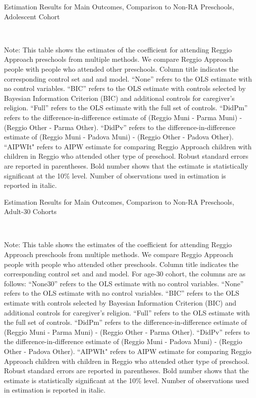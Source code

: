 \begin{table}[H] \caption{Estimation Results for Main Outcomes, Comparison to Non-RA Preschools, Adolescent Cohort} \label{ols-M-adol-reg-pres}
\scalebox{0.7}{}
\vspace{1ex} \\
\footnotesize\raggedright{Note: This table shows the estimates of the coefficient for attending Reggio Approach preschools from multiple methods. We compare Reggio Approach people with people who attended other preschools. Column title indicates the corresponding control set and and model. ``None'' refers to the OLS estimate with no control variables. ``BIC'' refers to the OLS estimate with controls selected by Bayesian Information Criterion (BIC) and additional controls for caregiver's religion. ``Full'' refers to the OLS estimate with the full set of controls. ``DidPm'' refers to the difference-in-difference estimate of (Reggio Muni - Parma Muni) - (Reggio Other - Parma Other). ``DidPv'' refers to the difference-in-difference estimate of (Reggio Muni - Padova Muni) - (Reggio Other - Padova Other). ``AIPWIt" refers to AIPW estimate for comparing Reggio Approach children with children in Reggio who attended other type of preschool. Robust standard errors are reported in parentheses. Bold number shows that the estimate is statistically significant at the 10\% level. Number of observations used in estimation is reported in italic.}
\end{table}




\begin{table}[H] \caption{Estimation Results for Main Outcomes, Comparison to Non-RA Preschools, Adult-30 Cohorts} \label{ols-M-adult30-reg-pres}
\scalebox{0.65}{}
\vspace{1ex} \\
\footnotesize\raggedright{Note: This table shows the estimates of the coefficient for attending Reggio Approach preschools from multiple methods. We compare Reggio Approach people with people who attended other preschools.  Column title indicates the corresponding control set and and model. For age-30 cohort, the columns are as follows: ``None30'' refers to the OLS estimate with no control variables. ``None'' refers to the OLS estimate with no control variables. ``BIC'' refers to the OLS estimate with controls selected by Bayesian Information Criterion (BIC) and additional controls for caregiver's religion. ``Full'' refers to the OLS estimate with the full set of controls. ``DidPm'' refers to the difference-in-difference estimate of (Reggio Muni - Parma Muni) - (Reggio Other - Parma Other). ``DidPv'' refers to the difference-in-difference estimate of (Reggio Muni - Padova Muni) - (Reggio Other - Padova Other). ``AIPWIt" refers to AIPW estimate for comparing Reggio Approach children with children in Reggio who attended other type of preschool. Robust standard errors are reported in parentheses. Bold number shows that the estimate is statistically significant at the 10\% level. Number of observations used in estimation is reported in italic.}
\end{table}

